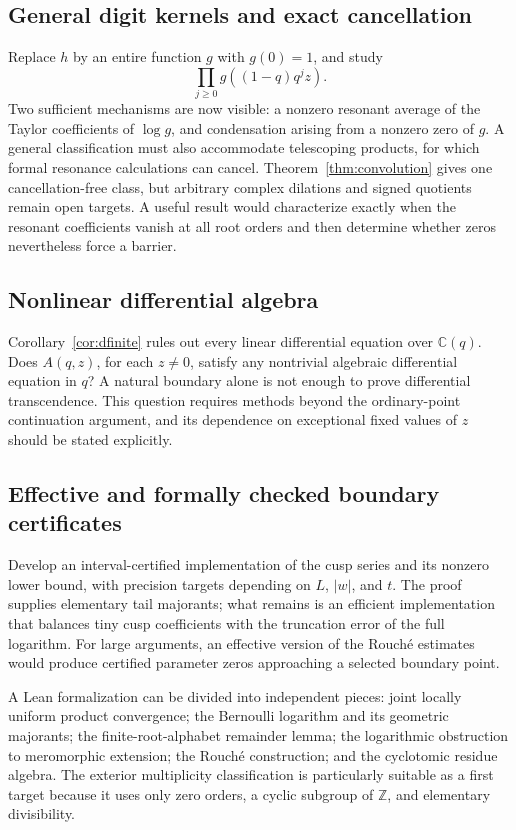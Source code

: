 \documentclass[11pt,a4paper]{article}
\numberwithin{equation}{section}
\theoremstyle{definition}
\theoremstyle{remark}
\newcommand{\C}{\mathbb C}
\newcommand{\Z}{\mathbb Z}
\begin{document}
\subsection{General digit kernels and exact cancellation}
Replace \(h\) by an entire function \(g\) with \(g(0)=1\), and study
\[
 \prod_{j\ge0}g((1-q)q^jz).
\]
Two sufficient mechanisms are now visible: a nonzero resonant average of the Taylor coefficients of \(\log g\), and condensation arising from a nonzero zero of \(g\). A general classification must also accommodate telescoping products, for which formal resonance calculations can cancel. Theorem~\ref{thm:convolution} gives one cancellation-free class, but arbitrary complex dilations and signed quotients remain open targets. A useful result would characterize exactly when the resonant coefficients vanish at all root orders and then determine whether zeros nevertheless force a barrier.

\subsection{Nonlinear differential algebra}
Corollary~\ref{cor:dfinite} rules out every linear differential equation over \(\C(q)\). Does \(A(q,z)\), for each \(z\ne0\), satisfy any nontrivial algebraic differential equation in \(q\)? A natural boundary alone is not enough to prove differential transcendence. This question requires methods beyond the ordinary-point continuation argument, and its dependence on exceptional fixed values of \(z\) should be stated explicitly.

\subsection{Effective and formally checked boundary certificates}
Develop an interval-certified implementation of the cusp series and its nonzero lower bound, with precision targets depending on \(L\), \(|w|\), and \(t\). The proof supplies elementary tail majorants; what remains is an efficient implementation that balances tiny cusp coefficients with the truncation error of the full logarithm. For large arguments, an effective version of the Rouch\'e estimates would produce certified parameter zeros approaching a selected boundary point.

A Lean formalization can be divided into independent pieces: joint locally uniform product convergence; the Bernoulli logarithm and its geometric majorants; the finite-root-alphabet remainder lemma; the logarithmic obstruction to meromorphic extension; the Rouch\'e construction; and the cyclotomic residue algebra. The exterior multiplicity classification is particularly suitable as a first target because it uses only zero orders, a cyclic subgroup of \(\Z\), and elementary divisibility.
\end{document}
